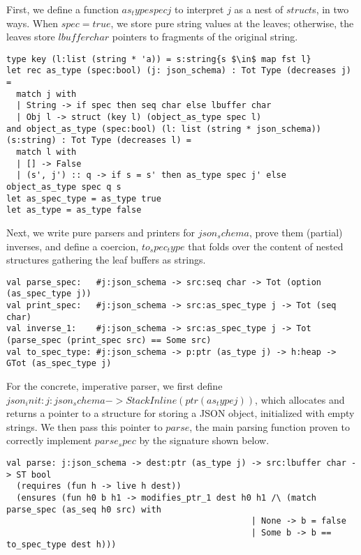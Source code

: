 First, we define a function \lst$as_type spec j$ to interpret \lst$j$
as a nest of \lst$struct$s, in two ways. When \lst$spec=true$, we
store pure string values at the leaves; otherwise, the leaves store
\lst$lbuffer char$ pointers to fragments of the original string.

\begin{lstlisting}
type key (l:list (string * 'a)) = s:string{s $\in$ map fst l}
let rec as_type (spec:bool) (j: json_schema) : Tot Type (decreases j) =
  match j with
  | String -> if spec then seq char else lbuffer char
  | Obj l -> struct (key l) (object_as_type spec l)
and object_as_type (spec:bool) (l: list (string * json_schema)) (s:string) : Tot Type (decreases l) =
  match l with
  | [] -> False
  | (s', j') :: q -> if s = s' then as_type spec j' else object_as_type spec q s
let as_spec_type = as_type true
let as_type = as_type false
\end{lstlisting}

Next, we write pure parsers and printers for \lst$json_schema$, prove
them (partial) inverses, and define a coercion, \lst$to_spec_type$
that folds over the content of nested structures gathering
the leaf buffers as strings. 

\begin{lstlisting}
val parse_spec:   #j:json_schema -> src:seq char -> Tot (option (as_spec_type j))
val print_spec:   #j:json_schema -> src:as_spec_type j -> Tot (seq char)
val inverse_1:    #j:json_schema -> src:as_spec_type j -> Tot (parse_spec (print_spec src) == Some src)
val to_spec_type: #j:json_schema -> p:ptr (as_type j) -> h:heap -> GTot (as_spec_type j)
\end{lstlisting}  

For the concrete, imperative parser, we first define
%
\lst$json_init: j:json_schema -> StackInline (ptr (as_type j))$, which
allocates and returns a pointer to a structure for storing a JSON
object, initialized with empty strings. We then pass this pointer to
\lst$parse$, the main parsing function proven to correctly implement
\lst$parse_spec$ by the signature shown below.

\begin{lstlisting}
val parse: j:json_schema -> dest:ptr (as_type j) -> src:lbuffer char -> ST bool
  (requires (fun h -> live h dest))
  (ensures (fun h0 b h1 -> modifies_ptr_1 dest h0 h1 /\ (match parse_spec (as_seq h0 src) with
                                                 | None -> b = false
                                                 | Some b -> b == to_spec_type dest h)))
\end{lstlisting}


